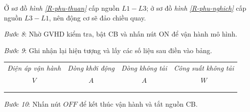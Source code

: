 \documentclass[13pt,a4paper]{extarticle}
\begin{document}
\begin{list}{--}{}
Ở sơ đồ \textit{hình \ref{R-phu-thuan}} cấp nguồn $L1-L3$; ở sơ đồ \textit{hình \ref{R-phu-nghich}} cấp nguồn $L3-L1$, nên động cơ sẽ đảo chiều quay.
\item \textit{Bước 8}: Nhờ GVHD kiểm tra, bật CB và nhấn nút ON để vận hành mô hình.
\item \textit{Bước 9}: Ghi nhận lại hiện tượng và lấy các số liệu sau điền vào bảng.
\begin{center}
\begin{tabular}{|c|c|c|c|}\hline
\textit{Điện áp vận hành} & \textit{Dòng khởi động} & \textit{Dòng không tải} & \textit{Công suất không tải}\\ 
$V$ & $A$ & $A$ & $W$ \\ \hline
& & & \\ \hline
& & & \\ \hline
\end{tabular}
\end{center}
\item \textit{Bước 10}: Nhấn nút $OFF$ để kết thúc vận hành và tắt nguồn CB.
\end{list}
\end{document}
